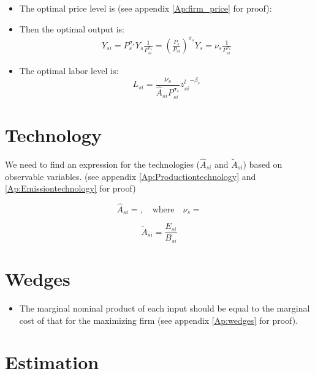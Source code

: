 \documentclass[12pt]{article} %
\begin{document}
\begin{itemize}
    \item The optimal price level is (see appendix \ref{Ap:firm_price} for proof):
    

    \item Then the optimal output is:
    \begin{equation}
        \begin{split}
            Y_{si} = P_s^{\sigma_s} {Y}_s \frac{1}{P_{si} ^{\sigma_s}} = \left(\frac{P_s}{P_{si}}\right)^{\sigma_s}{Y}_s = \nu_s \frac{1}{P_{si} ^{\sigma_s}}
        \end{split}
    \end{equation}
    \item The optimal labor level is:
    \begin{equation}
        L_{si} = \frac{\nu_s}{\hat{A}_{si}P_{si} ^{\sigma_s}}  {z_{si}^l}^{-\beta_s}
    \end{equation}
\end{itemize}

\section*{Technology}
We need to find an expression for the technologies ($\hat{A}_{si}$ and $\tilde{A}_{si}$) based on observable variables. (see appendix \ref{Ap:Productiontechnology} and \ref{Ap:Emissiontechnology} for proof)

\begin{equation*}
    \hat{A}_{si} = , \quad \text{where} \quad \nu_s = 
\end{equation*}

\begin{equation*}
    \tilde{A}_{si} = \frac{E_{si}}{B_{si}}
\end{equation*}



\section*{Wedges}
\begin{itemize}
    \item The marginal nominal product of each input should be equal to the marginal cost of that for the maximizing firm (see appendix \ref{Ap:wedges} for proof).
	
\end{itemize}
\section*{Estimation}

\clearpage
\end{document}
